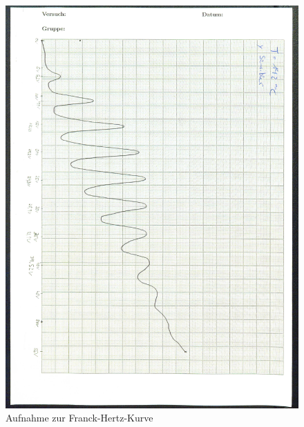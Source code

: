 \begin{figure}[H]
  \centering
  \includegraphics[width=\textwidth]{content/FHKurve.jpg}
  \caption{Aufnahme zur Franck-Hertz-Kurve}
  \label{Bild:3}
\end{figure}
